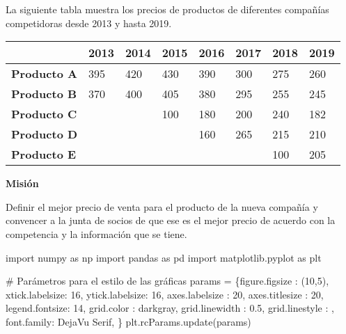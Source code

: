 \documentclass[
  letterpaper,
  DIV=11,
  numbers=noendperiod]{scrreprt}
\newenvironment{Shaded}{\begin{snugshade}}{\end{snugshade}}
\newcommand{\CommentTok}[1]{\textcolor[rgb]{0.37,0.37,0.37}{#1}}
\newcommand{\DecValTok}[1]{\textcolor[rgb]{0.68,0.00,0.00}{#1}}
\newcommand{\FloatTok}[1]{\textcolor[rgb]{0.68,0.00,0.00}{#1}}
\newcommand{\ImportTok}[1]{\textcolor[rgb]{0.00,0.46,0.62}{#1}}
\newcommand{\NormalTok}[1]{\textcolor[rgb]{0.00,0.23,0.31}{#1}}
\newcommand{\OperatorTok}[1]{\textcolor[rgb]{0.37,0.37,0.37}{#1}}
\newcommand{\StringTok}[1]{\textcolor[rgb]{0.13,0.47,0.30}{#1}}
\begin{document}
La siguiente tabla muestra los precios de productos de diferentes
compañías competidoras desde 2013 y hasta 2019.

\begin{longtable}[]{@{}llllllll@{}}
\toprule\noalign{}
& 2013 & 2014 & 2015 & 2016 & 2017 & 2018 & 2019 \\
\midrule\noalign{}
\endhead
\bottomrule\noalign{}
\endlastfoot
\textbf{Producto A} & 395 & 420 & 430 & 390 & 300 & 275 & 260 \\
\textbf{Producto B} & 370 & 400 & 405 & 380 & 295 & 255 & 245 \\
\textbf{Producto C} & & & 100 & 180 & 200 & 240 & 182 \\
\textbf{Producto D} & & & & 160 & 265 & 215 & 210 \\
\textbf{Producto E} & & & & & & 100 & 205 \\
\end{longtable}

\textbf{Misión}

Definir el mejor precio de venta para el producto de la nueva compañía y
convencer a la junta de socios de que ese es el mejor precio de acuerdo
con la competencia y la información que se tiene.

\begin{Shaded}
\begin{Highlighting}[]
\ImportTok{import}\NormalTok{ numpy }\ImportTok{as}\NormalTok{ np}
\ImportTok{import}\NormalTok{ pandas }\ImportTok{as}\NormalTok{ pd}
\ImportTok{import}\NormalTok{ matplotlib.pyplot }\ImportTok{as}\NormalTok{ plt}

\CommentTok{\# Parámetros para el estilo de las gráficas}
\NormalTok{params }\OperatorTok{=}\NormalTok{ \{}\StringTok{\textquotesingle{}figure.figsize\textquotesingle{}}\NormalTok{ : (}\DecValTok{10}\NormalTok{,}\DecValTok{5}\NormalTok{),}
          \StringTok{\textquotesingle{}xtick.labelsize\textquotesingle{}}\NormalTok{: }\DecValTok{16}\NormalTok{,}
          \StringTok{\textquotesingle{}ytick.labelsize\textquotesingle{}}\NormalTok{: }\DecValTok{16}\NormalTok{,}
          \StringTok{\textquotesingle{}axes.labelsize\textquotesingle{}}\NormalTok{ : }\DecValTok{20}\NormalTok{,}
          \StringTok{\textquotesingle{}axes.titlesize\textquotesingle{}}\NormalTok{ : }\DecValTok{20}\NormalTok{,}
          \StringTok{\textquotesingle{}legend.fontsize\textquotesingle{}}\NormalTok{: }\DecValTok{14}\NormalTok{,}
          \StringTok{\textquotesingle{}grid.color\textquotesingle{}}\NormalTok{     : }\StringTok{\textquotesingle{}darkgray\textquotesingle{}}\NormalTok{,}
          \StringTok{\textquotesingle{}grid.linewidth\textquotesingle{}}\NormalTok{ : }\FloatTok{0.5}\NormalTok{,}
          \StringTok{\textquotesingle{}grid.linestyle\textquotesingle{}}\NormalTok{ : }\StringTok{\textquotesingle{}{-}{-}\textquotesingle{}}\NormalTok{,}
          \StringTok{\textquotesingle{}font.family\textquotesingle{}}\NormalTok{: }\StringTok{\textquotesingle{}DejaVu Serif\textquotesingle{}}\NormalTok{,}
\NormalTok{         \}}
\NormalTok{plt.rcParams.update(params)}
\end{Highlighting}
\end{Shaded}
\end{document}

